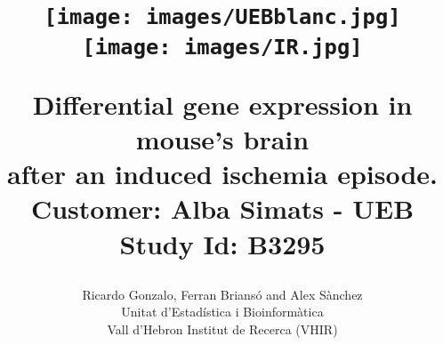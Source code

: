 \documentclass{article}
\renewcommand*\footnoterule{}
\begin{document}
\title{\begin{figure}[htbp]
       \centering
       \texttt{[image: images/UEBblanc.jpg]}
       \texttt{[image: images/IR.jpg]}
       \end{figure}
       \vspace{1cm}
       Differential gene expression in mouse's brain\\
       after an induced ischemia episode.\\
       {\normalsize Customer: Alba Simats - UEB Study Id: B3295
        \footnotetext{\footnoterule{\tiny\textcolor{violet}{VHIR-UEB-FOR-013v.01}}}\\
       }}\\
\\
\\
\author{Ricardo Gonzalo, Ferran Brians\'{o} and Alex S\`{a}nchez \\ 
        Unitat d'Estad\'{i}stica i Bioinform\`{a}tica \\
        Vall d'Hebron Institut de Recerca (VHIR)} \\




\maketitle

\newpage
\tableofcontents
\listoffigures
\listoftables

 





\end{document}
